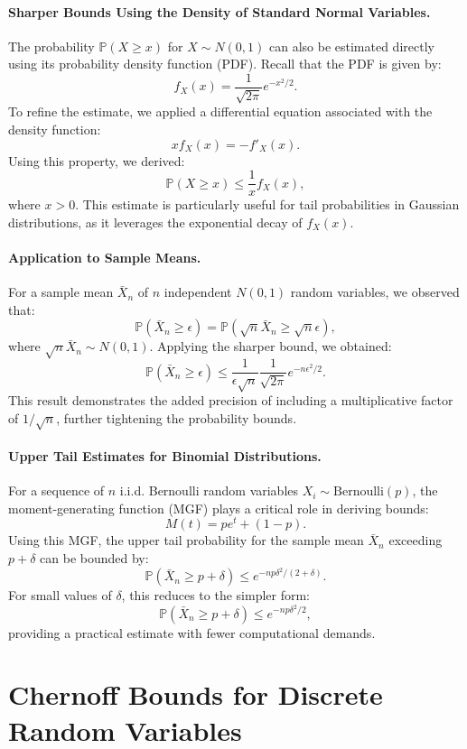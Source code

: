 \paragraph{Sharper Bounds Using the Density of Standard Normal Variables.}
The probability \( \mathbb{P}(X \geq x) \) for \( X \sim N(0, 1) \) can also be estimated directly using its probability density function (PDF). Recall that the PDF is given by:
\[
f_X(x) = \frac{1}{\sqrt{2\pi}} e^{-x^2 / 2}.
\]
To refine the estimate, we applied a differential equation associated with the density function:
\[
x f_X(x) = -f'_X(x).
\]
Using this property, we derived:
\[
\mathbb{P}(X \geq x) \leq \frac{1}{x} f_X(x),
\]
where \( x > 0 \). This estimate is particularly useful for tail probabilities in Gaussian distributions, as it leverages the exponential decay of \( f_X(x) \).

\paragraph{Application to Sample Means.}
For a sample mean \( \bar{X}_n \) of \( n \) independent \( N(0, 1) \) random variables, we observed that:
\[
\mathbb{P}(\bar{X}_n \geq \epsilon) = \mathbb{P}\left(\sqrt{n} \bar{X}_n \geq \sqrt{n} \epsilon\right),
\]
where \( \sqrt{n} \bar{X}_n \sim N(0, 1) \). Applying the sharper bound, we obtained:
\[
\mathbb{P}(\bar{X}_n \geq \epsilon) \leq \frac{1}{\epsilon \sqrt{n}} \frac{1}{\sqrt{2\pi}} e^{-n\epsilon^2 / 2}.
\]
This result demonstrates the added precision of including a multiplicative factor of \( 1 / \sqrt{n} \), further tightening the probability bounds.

\paragraph{Upper Tail Estimates for Binomial Distributions.}
For a sequence of \( n \) i.i.d. Bernoulli random variables \( X_i \sim \text{Bernoulli}(p) \), the moment-generating function (MGF) plays a critical role in deriving bounds:
\[
M(t) = p e^t + (1 - p).
\]
Using this MGF, the upper tail probability for the sample mean \( \bar{X}_n \) exceeding \( p + \delta \) can be bounded by:
\[
\mathbb{P}(\bar{X}_n \geq p + \delta) \leq e^{-n p \delta^2 / (2 + \delta)}.
\]
For small values of \( \delta \), this reduces to the simpler form:
\[
\mathbb{P}(\bar{X}_n \geq p + \delta) \leq e^{-n p \delta^2 / 2},
\]
providing a practical estimate with fewer computational demands.


\section{Chernoff Bounds for Discrete Random Variables}

